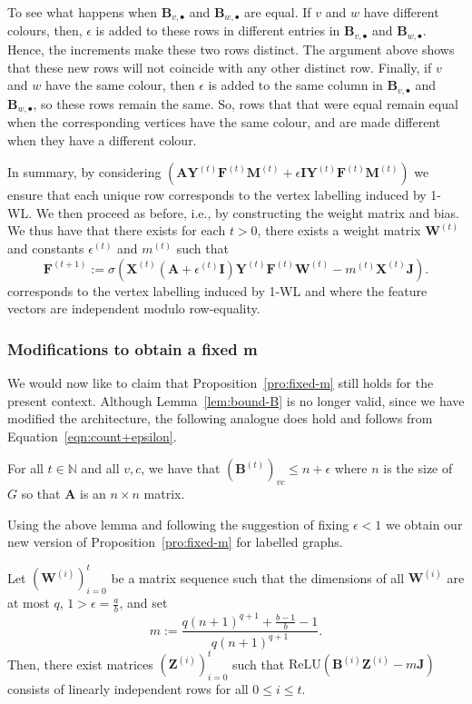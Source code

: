 To see what happens when  $\mathbf{B}_{v,\bullet}$ and $\mathbf{B}_{w,\bullet}$ are equal. If $v$ and $w$ have different colours, then, $\epsilon$ is added to these rows in different entries   in $\mathbf{B}_{v,\bullet}$ and $\mathbf{B}_{w,\bullet}$. Hence, the
increments make these two rows distinct. The argument above shows that these new rows will not coincide with any other distinct row. 
Finally, if $v$ and $w$ have the same colour, then $\epsilon$ is added to the same column in $\mathbf{B}_{v,\bullet}$ and $\mathbf{B}_{w,\bullet}$, so these
rows remain the same. So, rows that that were equal remain equal when the corresponding vertices have the same colour, and are made different when they have a different colour.

In summary, by considering
$(\mathbf{A}\mathbf{Y}^{(t)}\mathbf{F}^{(t)}\mathbf{M}^{(t)}+ \epsilon
\mathbf{I}\mathbf{Y}^{(t)}\mathbf{F}^{(t)}\mathbf{M}^{(t)})$ we ensure that each
unique row corresponds to 
the vertex labelling induced by 1-WL. We then proceed as before, i.e., by constructing the weight matrix and bias. We thus have that there exists for each $t>0$, there exists a weight matrix $\mathbf{W}^{(t)}$
and constants $\epsilon^{(t)}$ and $m^{(t)}$ such that 
$$\mathbf{F}^{(t+1)}:=\sigma(\mathbf{X}^{(t)}(\mathbf{A}+\epsilon^{(t)}
\mathbf{I})\mathbf{Y}^{(t)}\mathbf{F}^{(t)}\mathbf{W}^{(t)} - m^{(t)}\mathbf{X}^{(t)}\mathbf{J}).$$
corresponds to the vertex labelling induced by 1-WL and where the feature vectors are independent modulo row-equality.

\subsubsection{Modifications to obtain a fixed m}
We would now like to claim that Proposition~\ref{pro:fixed-m} still holds for
the present context. Although Lemma~\ref{lem:bound-B} is no longer valid, since
we have modified the architecture, the following analogue does hold and
follows from Equation~\eqref{eqn:count+epsilon}.
\begin{lemma}\label{lem:bound-B}
    For all $t \in \mathbb{N}$ and all $v,c$, we have that
    $(\mathbf{B}^{(t)})_{vc} \leq n + \epsilon$ where $n$ is the size of $G$ so that
    $\mathbf{A}$ is an $n \times n$ matrix.
\end{lemma}

Using the above lemma and following the suggestion of fixing $\epsilon < 1$ we
obtain our new version of Proposition~\ref{pro:fixed-m} for labelled graphs.
\begin{proposition}
    Let $(\mathbf{W}^{(i)})^t_{i=0}$ be a matrix sequence such that the dimensions
    of all $\mathbf{W}^{(i)}$ are at most $q$, $1 > \epsilon = \frac{a}{b}$, and set
    \[
      m := \frac{q(n+1)^{q+1} + \frac{b-1}{b} - 1}{q(n+1)^{q+1}}.
    \]
    Then, there exist matrices $(\mathbf{Z}^{(i)})_{i=0}^t$ such that $\mathrm{ReLU}(\mathbf{B}^{(i)}\mathbf{Z}^{(i)} - m\mathbf{J})$ consists of linearly independent rows for all $0 \leq i \leq t$.
\end{proposition}

